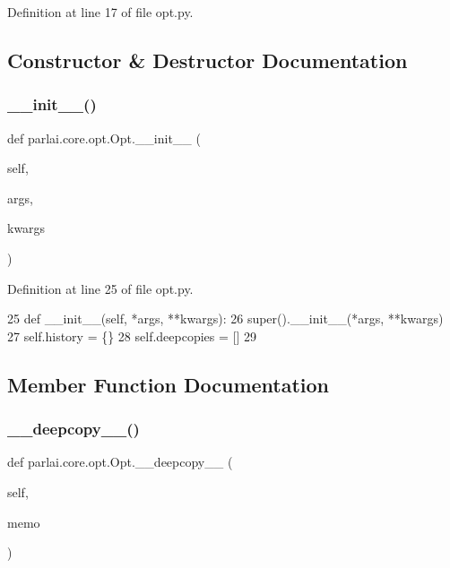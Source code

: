 Definition at line 17 of file opt.\+py.



\subsection{Constructor \& Destructor Documentation}
\mbox{\label{classparlai_1_1core_1_1opt_1_1Opt_ae5639342fb9f6d1f942547b57f29491e}} 
\subsubsection{\texorpdfstring{\+\_\+\+\_\+init\+\_\+\+\_\+()}{\_\_init\_\_()}}
{\footnotesize\ttfamily def parlai.\+core.\+opt.\+Opt.\+\_\+\+\_\+init\+\_\+\+\_\+ (\begin{DoxyParamCaption}\item[{}]{self,  }\item[{}]{args,  }\item[{}]{kwargs }\end{DoxyParamCaption})}



Definition at line 25 of file opt.\+py.


\begin{DoxyCode}
25     \textcolor{keyword}{def }\_\_init\_\_(self, *args, **kwargs):
26         super().\_\_init\_\_(*args, **kwargs)
27         self.history = \{\}
28         self.deepcopies = []
29 
\end{DoxyCode}


\subsection{Member Function Documentation}
\mbox{\label{classparlai_1_1core_1_1opt_1_1Opt_a5d1da8fbfdb0a0f6a9797d4c0f5528fb}} 
\subsubsection{\texorpdfstring{\+\_\+\+\_\+deepcopy\+\_\+\+\_\+()}{\_\_deepcopy\_\_()}}
{\footnotesize\ttfamily def parlai.\+core.\+opt.\+Opt.\+\_\+\+\_\+deepcopy\+\_\+\+\_\+ (\begin{DoxyParamCaption}\item[{}]{self,  }\item[{}]{memo }\end{DoxyParamCaption})}

